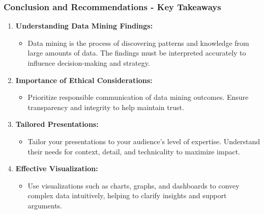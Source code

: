 \documentclass{beamer}
\begin{document}
\begin{frame}[fragile]
    \frametitle{Conclusion and Recommendations - Key Takeaways}
    \begin{enumerate}
        \item \textbf{Understanding Data Mining Findings:}
        \begin{itemize}
            \item Data mining is the process of discovering patterns and knowledge from large amounts of data. The findings must be interpreted accurately to influence decision-making and strategy.
        \end{itemize}

        \item \textbf{Importance of Ethical Considerations:}
        \begin{itemize}
            \item Prioritize responsible communication of data mining outcomes. Ensure transparency and integrity to help maintain trust.
        \end{itemize}

        \item \textbf{Tailored Presentations:}
        \begin{itemize}
            \item Tailor your presentations to your audience’s level of expertise. Understand their needs for context, detail, and technicality to maximize impact.
        \end{itemize}

        \item \textbf{Effective Visualization:}
        \begin{itemize}
            \item Use visualizations such as charts, graphs, and dashboards to convey complex data intuitively, helping to clarify insights and support arguments.
        \end{itemize}
    \end{enumerate}
\end{frame}
\end{document}
